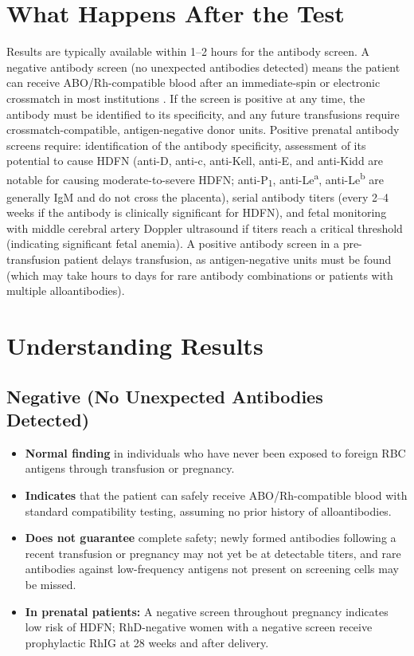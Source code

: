 \section*{What Happens After the Test}
Results are typically available within 1--2 hours for the antibody screen. A negative antibody screen (no unexpected antibodies detected) means the patient can receive ABO/Rh-compatible blood after an immediate-spin or electronic crossmatch in most institutions \cite{wallach2022interpretation}. If the screen is positive at any time, the antibody must be identified to its specificity, and any future transfusions require crossmatch-compatible, antigen-negative donor units. Positive prenatal antibody screens require: identification of the antibody specificity, assessment of its potential to cause HDFN (anti-D, anti-c, anti-Kell, anti-E, and anti-Kidd are notable for causing moderate-to-severe HDFN; anti-P\textsubscript{1}, anti-Le\textsuperscript{a}, anti-Le\textsuperscript{b} are generally IgM and do not cross the placenta), serial antibody titers (every 2--4 weeks if the antibody is clinically significant for HDFN), and fetal monitoring with middle cerebral artery Doppler ultrasound if titers reach a critical threshold (indicating significant fetal anemia). A positive antibody screen in a pre-transfusion patient delays transfusion, as antigen-negative units must be found (which may take hours to days for rare antibody combinations or patients with multiple alloantibodies).

\section*{Understanding Results}

\subsection*{Negative (No Unexpected Antibodies Detected)}
\begin{itemize}
  \item \textbf{Normal finding} in individuals who have never been exposed to foreign RBC antigens through transfusion or pregnancy.
  \item \textbf{Indicates} that the patient can safely receive ABO/Rh-compatible blood with standard compatibility testing, assuming no prior history of alloantibodies.
  \item \textbf{Does not guarantee} complete safety; newly formed antibodies following a recent transfusion or pregnancy may not yet be at detectable titers, and rare antibodies against low-frequency antigens not present on screening cells may be missed.
  \item \textbf{In prenatal patients:} A negative screen throughout pregnancy indicates low risk of HDFN; RhD-negative women with a negative screen receive prophylactic RhIG at 28 weeks and after delivery.
\end{itemize}

